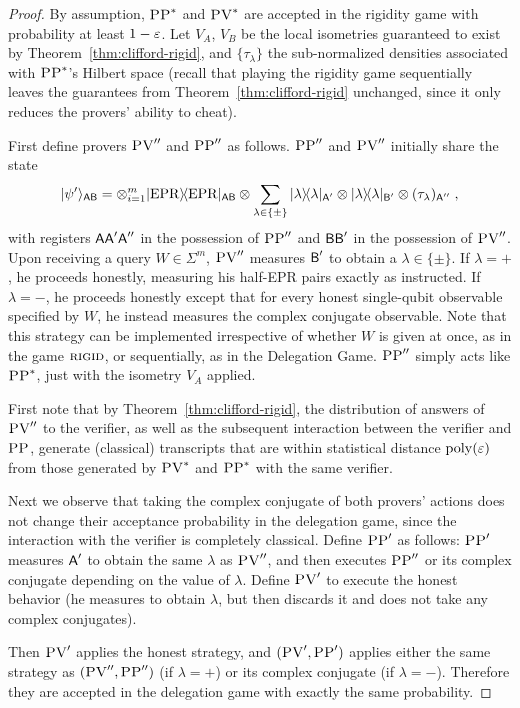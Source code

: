 \begin{proof}
By assumption, $\textsc{PP}^*$ and $\textsc{PV}^*$ are accepted in the rigidity game with
  probability at least $1-\varepsilon$. Let $V_A$, $V_B$ be the local isometries
  guaranteed to exist by Theorem~\ref{thm:clifford-rigid}, and
  $\{\tau_\lambda\}$ the sub-normalized densities associated with $\textsc{PP}^*$'s
  Hilbert space (recall that playing the rigidity game sequentially leaves the
  guarantees from Theorem~\ref{thm:clifford-rigid} unchanged, since it only reduces the provers' ability to cheat).

First define provers $\textsc{PV}''$ and $\textsc{PP}''$ as follows. $\textsc{PP}''$ and $\textsc{PV}''$ initially share the state 
$$|\psi'\rangle_{{\textsf{AB}}} = \otimes_{i=1}^{m} |{\rm EPR}\rangle\!\langle{\rm EPR}|_{{\textsf{AB}}} \otimes \sum_{\lambda\in\{\pm\}}  |\lambda\rangle\!\langle\lambda|_{{\textsf{A}}'}\otimes |\lambda\rangle\!\langle\lambda|_{{\textsf{B}}'}\otimes (\tau_\lambda)_{{\textsf{A}}''}\;,$$
with registers ${\textsf{A}}{\textsf{A}}'{\textsf{A}}''$ in the possession of $\textsc{PP}''$ and ${\textsf{BB}}'$ in the possession of $\textsc{PV}''$. 
Upon receiving a query $W\in \Sigma^m$, $\textsc{PV}''$ measures ${\textsf{B}}'$ to obtain a $\lambda\in\{\pm\}$. If $\lambda=+$, he proceeds honestly, measuring his half-EPR pairs exactly as instructed. If $\lambda=-$, he proceeds honestly except that for every honest single-qubit observable specified by $W$, he instead measures the complex conjugate observable. Note that this strategy can be implemented irrespective of whether $W$ is given at once, as in the game $\textsc{rigid}$, or sequentially, as in the Delegation Game. $\textsc{PP}''$ simply acts like $\textsc{PP}^*$, just with the isometry $V_A$ applied. 

First note that by Theorem~\ref{thm:clifford-rigid}, the distribution of answers of $\textsc{PV}''$ to the verifier, as well as the subsequent interaction between the verifier and $\textsc{PP}$, generate (classical) transcripts that are within statistical distance $\operatorname{poly}(\varepsilon)$ from those generated by $\textsc{PV}^*$ and $\textsc{PP}^*$ with the same verifier. 

Next we observe that taking the complex conjugate of both provers' actions does not change their acceptance probability in the delegation game, since the interaction with the verifier is completely classical. Define $\textsc{PP}'$ as follows: $\textsc{PP}'$ measures ${\textsf{A}}'$ to obtain the same $\lambda$ as $\textsc{PV}''$, and then executes $\textsc{PP}''$ or its complex conjugate depending on the value of $\lambda$. Define $\textsc{PV}'$ to execute the honest behavior (he measures to obtain $\lambda$, but then discards it and does not take any complex conjugates). 

Then $\textsc{PV}'$ applies the honest strategy, and $(\textsc{PV}',\textsc{PP}')$ applies either the same strategy as $(\textsc{PV}'',\textsc{PP}'')$ (if $\lambda=+$) or its complex conjugate (if $\lambda=-$). Therefore they are accepted in the delegation game with exactly the same probability. 
\end{proof}


